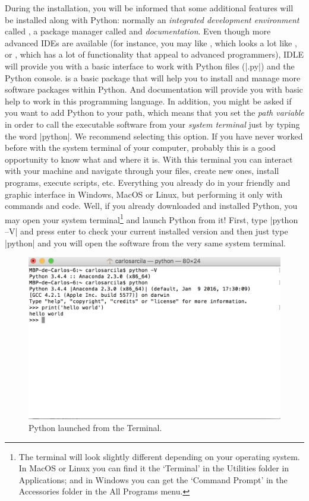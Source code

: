 During the installation, you will be informed that some additional
features will be installed along with Python: normally an
\emph{integrated development environment} called , a package
manager called  and \emph{documentation}. Even though more
advanced IDEs are available (for instance, you may like ,
which looks a lot like , or , which has a lot of functionality that appeal to advanced programmers), IDLE will
provide you with a basic interface to work with Python files (|.py|)
and the Python console.  is a basic package that will help
you to install and manage more software packages within Python. And
documentation will provide you with basic help to work in this
programming language.  In addition, you might be asked if you
want to add Python to your path, which means that you set the
\emph{path variable} in order to call the executable software from
your \emph{system terminal} just by typing the word |python|. We
recommend selecting this option.  If you have never worked before with
the system terminal of your computer, probably this is a good
opportunity to know what and where it is. With this terminal you can
interact with your machine and navigate through your files, create new
ones, install programs, execute scripts, etc.  Everything you already
do in your friendly and graphic interface in Windows, MacOS or Linux,
but performing it only with commands and code. Well, if you already
downloaded and installed Python, you may open your system
terminal\footnote{The terminal will look slightly different depending
  on your operating system. In MacOS or Linux you can find it the
  `Terminal' in the Utilities folder in Applications; and in Windows
  you can get the `Command Prompt' in the Accessories folder in the
  All Programs menu.}  and launch Python from it! First, type
|python --V| and press enter to check your current installed version and then
just type |python| and you will open the software from the very same
system terminal.

\begin{figure}
\centering
\includegraphics[width=0.9\linewidth]{figures/ch3_python_from_terminal}
\caption{Python launched from the Terminal.}
\label{fig:python_from_terminal}
\end{figure}

